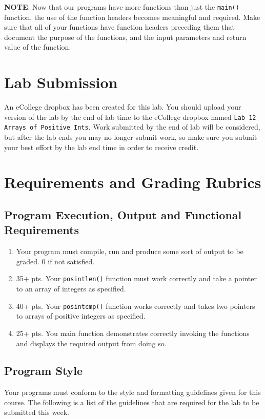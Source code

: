 \documentclass[11pt]{article}
\begin{document}
\textbf{NOTE}: Now that our programs have more functions than just the
\verb~main()~ function, the use of the function headers becomes meaningful
and required.  Make sure that all of your functions have function
headers preceding them that document the purpose of the functions, and
the input parameters and return value of the function.
\section*{Lab Submission}
\label{sec-4}

An eCollege dropbox has been created for this lab.  You should upload
your version of the lab by the end of lab time to the eCollege dropbox
named \verb~Lab 12 Arrays of Positive Ints~.  Work submitted by the end of
lab will be considered, but after the lab ends you may no longer
submit work, so make sure you submit your best effort by the lab end
time in order to receive credit.
\section*{Requirements and Grading Rubrics}
\label{sec-5}

\subsection*{Program Execution, Output and Functional Requirements}
\label{sec-5-1}

\begin{enumerate}
\item Your program must compile, run and produce some sort of output to be
graded. 0 if not satisfied.
\item 35+ pts.  Your \verb~posintlen()~ function must work correctly and take
a pointer to an array of integers as specified.
\item 40+ pts.  Your \verb~posintcmp()~ function works correctly and takes
two pointers to arrays of positive integers as specified.
\item 25+ pts. You main function demonstrates correctly invoking the functions
and displays the required output from doing so.
\end{enumerate}

\subsection*{Program Style}
\label{sec-5-2}

Your programs must conform to the style and formatting guidelines given for this course.
The following is a list of the guidelines that are required for the lab to be submitted
this week.
\end{document}
